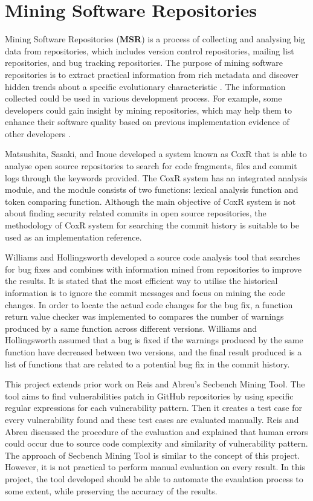 \documentclass[12pt, a4paper]{report}
\begin{document}
\section{Mining Software Repositories}
Mining Software Repositories (\textbf{MSR}) is a process of collecting and analysing big data from
repositories, which includes version control repositories, mailing list repositories, and bug
tracking repositories. The purpose of mining software repositories is to extract practical
information from rich metadata and discover hidden trends about a specific evolutionary
characteristic \cite{kagdi_2007}. The information collected could be used in various development
process. For example, some developers could gain insight by mining repositories, which may help them
to enhance their software quality based on previous implementation evidence of other developers
\cite{hassan_2008}.

Matsushita, Sasaki, and Inoue \cite{matsushita_2005} developed a system known as CoxR that is able
to analyse open source repositories to search for code fragments, files and commit logs through the
keywords provided. The CoxR system has an integrated analysis module, and the module consists of two
functions: lexical analysis function and token comparing function. Although the main objective of
CoxR system is not about finding security related commits in open source repositories, the
methodology of CoxR system for searching the commit history is suitable to be used as an
implementation reference.

Williams and Hollingsworth \cite{williams_2005} developed a source code analysis tool that searches
for bug fixes and combines with information mined from repositories to improve the results. It is
stated that the most efficient way to utilise the historical information is to ignore the commit
messages and focus on mining the code changes. In order to locate the actual code changes for the
bug fix, a function return value checker was implemented to compares the number of warnings produced
by a same function across different versions. Williams and Hollingsworth assumed that a bug is fixed
if the warnings produced by the same function have decreased between two versions, and the final
result produced is a list of functions that are related to a potential bug fix in the commit
history.

This project extends prior work on Reis and Abreu's \cite{secbench} Secbench Mining Tool. The tool
aims to find vulnerabilities patch in GitHub repositories by using specific regular expressions for
each vulnerability pattern. Then it creates a test case for every vulnerability found and these test
cases are evaluated manually. Reis and Abreu \cite{reis_2017} discussed the procedure of the
evaluation and explained that human errors could occur due to source code complexity and similarity
of vulnerability pattern. The approach of Secbench Mining Tool is similar to the concept of this
project. However, it is not practical to perform manual evaluation on every result. In this project,
the tool developed should be able to automate the evaulation process to some extent, while
preserving the accuracy of the results.
\end{document}
